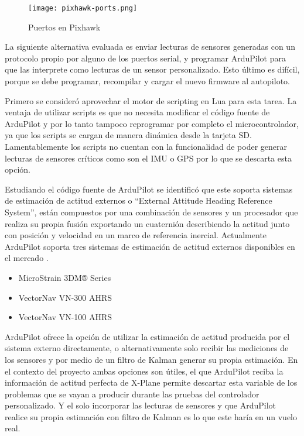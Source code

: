 \begin{figure}[h]
    \centering
    \texttt{[image: pixhawk-ports.png]}
    \caption{Puertos en Pixhawk}
    \label{fig:pixhawk-ports}
\end{figure}

La siguiente alternativa evaluada es enviar lecturas de sensores generadas con un protocolo propio por alguno de los puertos serial, y programar ArduPilot para que las interprete como lecturas de un sensor personalizado. Esto último es difícil, porque se debe programar, recompilar y cargar el nuevo firmware al autopiloto.

Primero se consideró aprovechar el motor de scripting en Lua para esta tarea. La ventaja de utilizar scripts es que no necesita modificar el código fuente de ArduPilot y por lo tanto tampoco reprogramar por completo el microcontrolador, ya que los scripts se cargan de manera dinámica desde la tarjeta SD. Lamentablemente los scripts no cuentan con la funcionalidad de poder generar lecturas de sensores críticos como son el IMU o GPS por lo que se descarta esta opción.

Estudiando el código fuente de ArduPilot se identificó que este soporta sistemas de estimación de actitud externos o ``External Attitude Heading Reference System'', están compuestos por una combinación de sensores y un procesador que realiza su propia fusión exportando un cuaternión describiendo la actitud junto con posición y velocidad en un marco de referencia inercial. Actualmente ArduPilot soporta tres sistemas de estimación de actitud externos disponibles en el mercado \cite{ap-eahrs}.

\begin{itemize}
    \item MicroStrain 3DM® Series
    \item VectorNav VN-300 AHRS
    \item VectorNav VN-100 AHRS
\end{itemize}

ArduPilot ofrece la opción de utilizar la estimación de actitud producida por el sistema externo directamente, o alternativamente solo recibir las mediciones de los sensores y por medio de un filtro de Kalman generar su propia estimación. En el contexto del proyecto ambas opciones son útiles, el que ArduPilot reciba la información de actitud perfecta de X-Plane permite descartar esta variable de los problemas que se vayan a producir durante las pruebas del controlador personalizado. Y el solo incorporar las lecturas de sensores y que ArduPilot realice su propia estimación con filtro de Kalman es lo que este haría en un vuelo real.

